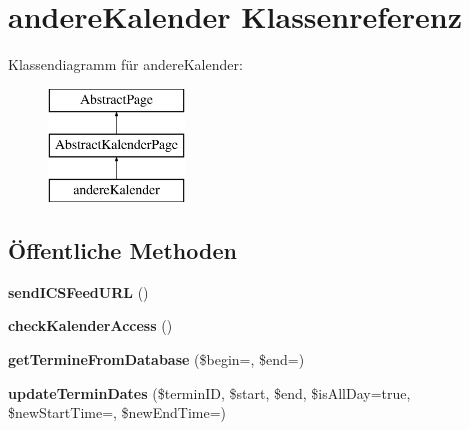 \hypertarget{classandere_kalender}{}\section{andere\+Kalender Klassenreferenz}
\label{classandere_kalender}
Klassendiagramm für andere\+Kalender\+:\begin{figure}[H]
\begin{center}
\leavevmode
\includegraphics[height=3.000000cm]{classandere_kalender}
\end{center}
\end{figure}
\subsection*{Öffentliche Methoden}
\begin{DoxyCompactItemize}
\item 
\mbox{\label{classandere_kalender_afcd36272e86c36524c39a8cba0375cb4}} 
{\bfseries send\+I\+C\+S\+Feed\+U\+RL} ()
\item 
\mbox{\label{classandere_kalender_aac1424edb3187b5c1ed2e4772fbb308a}} 
{\bfseries check\+Kalender\+Access} ()
\item 
\mbox{\label{classandere_kalender_ab2c65985684bd459f412849f20af1038}} 
{\bfseries get\+Termine\+From\+Database} (\$begin=\textquotesingle{}\textquotesingle{}, \$end=\textquotesingle{}\textquotesingle{})
\item 
\mbox{\label{classandere_kalender_abbf068674ff75e0bfdd46564f5268dff}} 
{\bfseries update\+Termin\+Dates} (\$termin\+ID, \$start, \$end, \$is\+All\+Day=true, \$new\+Start\+Time=\textquotesingle{}\textquotesingle{}, \$new\+End\+Time=\textquotesingle{}\textquotesingle{})
\end{DoxyCompactItemize}
